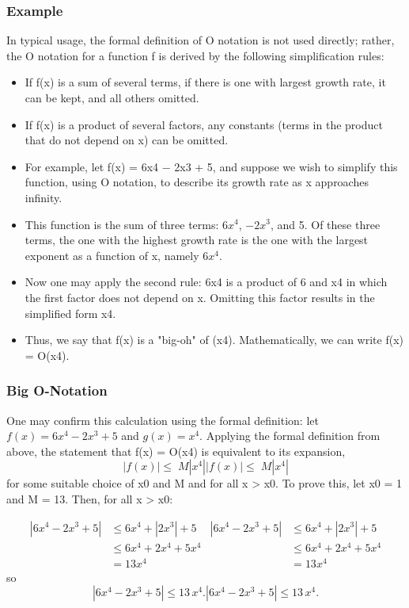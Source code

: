 \documentclass{beamer}
\begin{document}
\begin{frame}
\frametitle{Example}
In typical usage, the formal definition of O notation is not used directly; rather, the O notation for a function f is derived by the following simplification rules:
\begin{itemize}
\item If f(x) is a sum of several terms, if there is one with largest growth rate, it can be kept, and all others omitted.
\item If f(x) is a product of several factors, any constants (terms in the product that do not depend on x) can be omitted.
\end{itemize}
\end{frame}
\begin{frame}
\begin{itemize}
\item For example, let f(x) = 6x4 − 2x3 + 5, and suppose we wish to simplify this function, using O notation, to describe its growth rate as x approaches infinity. 
\item This function is the sum of three terms: $6x^4$, $−2x^3$, and 5. Of these three terms, the one with the highest growth rate is the one with the largest exponent as a function of x, namely $6x^4$. 
\item Now one may apply the second rule: 6x4 is a product of 6 and x4 in which the first factor does not depend on x. Omitting this factor results in the simplified form x4. 
\item Thus, we say that f(x) is a "big-oh" of (x4). Mathematically, we can write f(x) = O(x4). 
\end{itemize}
\end{frame}
\begin{frame}
\frametitle{Big O-Notation}
One may confirm this calculation using the formal definition: let $f(x) = 6x^4 − 2x^3 + 5$ and $g(x) = x^4$. Applying the formal definition from above, the statement that f(x) = O(x4) is equivalent to its expansion,
\[
{\displaystyle |f(x)|\leq \;M|x^{4}|} {\displaystyle |f(x)|\leq \;M|x^{4}|}\]
for some suitable choice of x0 and M and for all x > x0. To prove this, let x0 = 1 and M = 13. Then, for all x > x0:

\[{\displaystyle {\begin{aligned}|6x^{4}-2x^{3}+5|&\leq 6x^{4}+|2x^{3}|+5\\&\leq 6x^{4}+2x^{4}+5x^{4}\\&=13x^{4}\end{aligned}}} {\displaystyle {\begin{aligned}|6x^{4}-2x^{3}+5|&\leq 6x^{4}+|2x^{3}|+5\\&\leq 6x^{4}+2x^{4}+5x^{4}\\&=13x^{4}\end{aligned}}}\]
so
\[
{\displaystyle |6x^{4}-2x^{3}+5|\leq 13\,x^{4}.} |6x^{4}-2x^{3}+5|\leq 13\,x^{4}.
\]
\end{frame}
\end{document}
